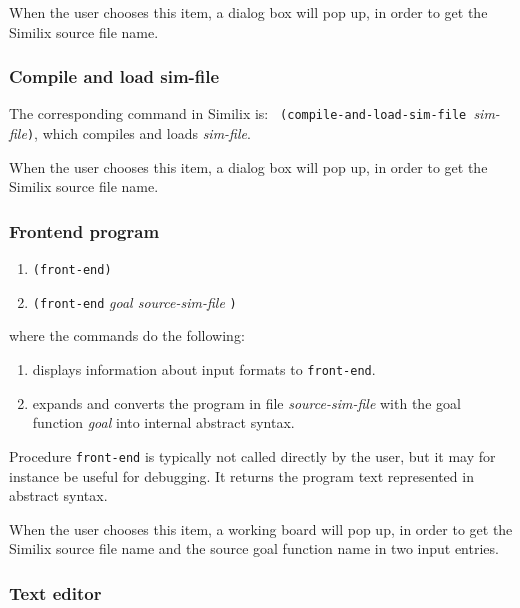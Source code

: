 \begin{sloppypar}
When the user chooses this item, a dialog box will pop up, in order to
get the Similix source file name.



\subsubsection{Compile and load sim-file}


The corresponding command in Similix is: {\tt
(compile-and-load-sim-file }{\it sim-file}{\tt )}, which compiles and
loads {\it sim-file}.
   
When the user chooses this item, a dialog box will pop up, in order to
get the Similix source file name.



\subsubsection{Frontend program}


\begin{enumerate}
\item {\tt (front-end)}
\item {\tt (front-end} {\it goal source-sim-file} {\tt )}
\end{enumerate}

\noindent where the commands do the following:

\begin{enumerate}

\item displays information about input formats to {\tt front-end}.

\item expands and converts the program in file {\it source-sim-file} with the
goal function {\it goal} into internal abstract syntax.

\end{enumerate}

   Procedure {\tt front-end} is typically not called directly by the
user, but it may for instance be useful for debugging. It returns the
program text represented in abstract syntax.
   
When the user chooses this item, a working board will pop up, in order
to get the Similix source file name and the source goal function name
in two input entries.



\subsubsection{Text editor}



\end{sloppypar}
